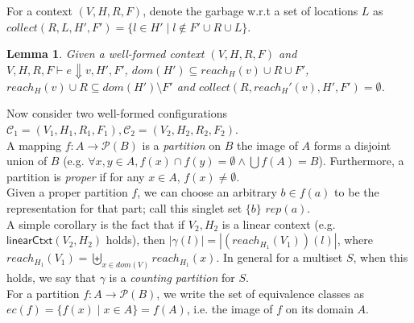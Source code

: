 \documentclass{easychair}
\newcommand{\na}[1]{\mathsf{linearCtxt}(#1)}
\newtheorem{lemma}[theorem]{Lemma}
\theoremstyle{definition}
\begin{document}
For a context $(V,H,R,F)$, denote the
garbage w.r.t a set of locations $L$ 
as $collect(R,L,H',F') = \{l \in H' \mid l \notin F' \cup R \cup L\}$.
\begin{lemma}\label{itm:eager}
	Given a well-formed context $(V,H,R,F)$ and $V,H,R,F \vdash e \Downarrow v,H',F'$, 
	$dom(H') \subseteq reach_H(v) \cup R \cup F'$,
	$reach_H(v) \cup R \subseteq dom(H') \setminus F'$ and
	$collect(R,reach_H'(v),H',F') = \emptyset$.
\end{lemma}

Now consider two well-formed configurations $\mathcal{C}_1 = (V_1,H_1,R_1,F_1),
 \mathcal{C}_2 = (V_2,H_2,R_2,F_2)$.\\

A mapping $f : A \to \mathcal{P}(B)$ is a \emph{partition} on $B$ the image of 
$A$ forms a disjoint union of $B$ 
(e.g. $\forall x,y \in A, f(x) \cap f(y) = \emptyset \land \bigcup f(A) = B$). Furthermore,
a partition is \emph{proper} if for any $x \in A$, $f(x) \neq \emptyset$.\\
Given a proper partition $f$, we can choose an arbitrary 
$b \in f(a)$ to be the representation for that part; call this 
singlet set $\{b\}$ $rep(a)$.\\

A simple corollary is the fact that if $V_2,H_2$ is a linear context (e.g. $\na{V_2,H_2}$ holds), then
$|\gamma(l)| = |(reach_{H_1}(V_1))(l)|$, where $ reach_{H_1}(V_1) = \biguplus_{x \in dom(V)} reach_{H_1}(x)$. 
In general for a multiset $S$, when this holds, we say that 
$\gamma$ is a \emph{counting partition} for $S$.\\

For a partition $f : A \to \mathcal{P}(B)$, we write the set of equivalence classes
as $ec(f) = \{f(x) \mid x \in A\} = f(A)$, i.e. the image of $f$ on its domain $A$.\\
\end{document}
